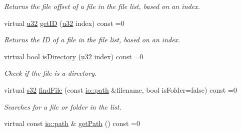 \begin{DoxyCompactItemize}
\begin{DoxyCompactList}\small\item\em Returns the file offset of a file in the file list, based on an index. \end{DoxyCompactList}\item 
virtual \hyperlink{namespaceirr_a0416a53257075833e7002efd0a18e804}{u32} \hyperlink{classirr_1_1io_1_1IFileList_ab5c1f08fbbde4cda0e3b135499a5fc84}{get\+ID} (\hyperlink{namespaceirr_a0416a53257075833e7002efd0a18e804}{u32} index) const  =0
\begin{DoxyCompactList}\small\item\em Returns the ID of a file in the file list, based on an index. \end{DoxyCompactList}\item 
virtual bool \hyperlink{classirr_1_1io_1_1IFileList_ac10cdbc20abb0817010d869af0032078}{is\+Directory} (\hyperlink{namespaceirr_a0416a53257075833e7002efd0a18e804}{u32} index) const  =0
\begin{DoxyCompactList}\small\item\em Check if the file is a directory. \end{DoxyCompactList}\item 
virtual \hyperlink{namespaceirr_ac66849b7a6ed16e30ebede579f9b47c6}{s32} \hyperlink{classirr_1_1io_1_1IFileList_a31c90fda10d00bdab5c83d7c3d35807c}{find\+File} (const \hyperlink{namespaceirr_1_1io_ab1bdc45edb3f94d8319c02bc0f840ee1}{io\+::path} \&filename, bool is\+Folder=false) const  =0
\begin{DoxyCompactList}\small\item\em Searches for a file or folder in the list. \end{DoxyCompactList}\item 
virtual const \hyperlink{namespaceirr_1_1io_ab1bdc45edb3f94d8319c02bc0f840ee1}{io\+::path} \& \hyperlink{classirr_1_1io_1_1IFileList_a0b77ba658cddaa7120483c9c55cac396}{get\+Path} () const  =0\hypertarget{classirr_1_1io_1_1IFileList_a0b77ba658cddaa7120483c9c55cac396}{}\label{classirr_1_1io_1_1IFileList_a0b77ba658cddaa7120483c9c55cac396}


\end{DoxyCompactItemize}
